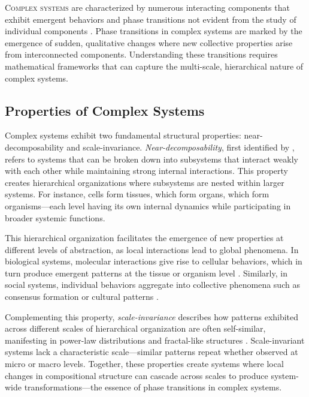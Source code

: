 \lettrine[lines=2, findent=3pt, nindent=0pt]{C}{omplex systems} are characterized by numerous interacting components that exhibit emergent behaviors and phase transitions not evident from the study of individual components \citep{mitchell2009complexity}. Phase transitions in complex systems are marked by the emergence of sudden, qualitative changes where new collective properties arise from interconnected components. Understanding these transitions requires mathematical frameworks that can capture the multi-scale, hierarchical nature of complex systems.

\subsection{Properties of Complex Systems}

Complex systems exhibit two fundamental structural properties: near-decomposability and scale-invariance. \textit{Near-decomposability}, first identified by \citet{simon1962architecture}, refers to systems that can be broken down into subsystems that interact weakly with each other while maintaining strong internal interactions. This property creates hierarchical organizations where subsystems are nested within larger systems. For instance, cells form tissues, which form organs, which form organisms—each level having its own internal dynamics while participating in broader systemic functions.

This hierarchical organization facilitates the emergence of new properties at different levels of abstraction, as local interactions lead to global phenomena. In biological systems, molecular interactions give rise to cellular behaviors, which in turn produce emergent patterns at the tissue or organism level \citep{battiston2020networks}. Similarly, in social systems, individual behaviors aggregate into collective phenomena such as consensus formation or cultural patterns \citep{castellano2009statistical}.

Complementing this property, \textit{scale-invariance} describes how patterns exhibited across different scales of hierarchical organization are often self-similar, manifesting in power-law distributions and fractal-like structures \citep{west2017scale}. Scale-invariant systems lack a characteristic scale—similar patterns repeat whether observed at micro or macro levels. Together, these properties create systems where local changes in compositional structure can cascade across scales to produce system-wide transformations—the essence of phase transitions in complex systems.

